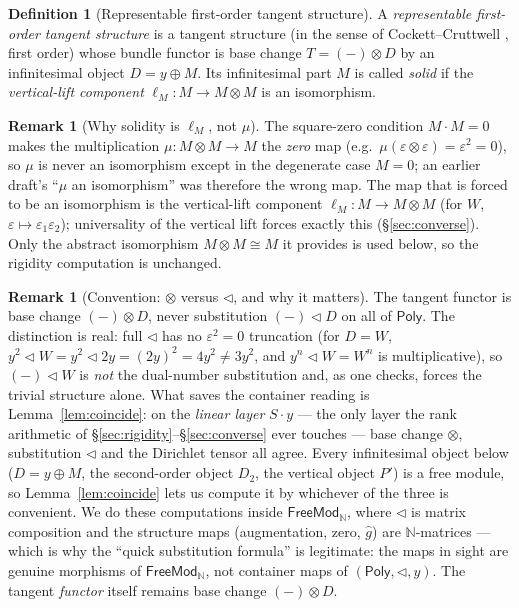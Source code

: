 \documentclass[11pt]{article}
\theoremstyle{definition}
\newtheorem{definition}[theorem]{Definition}
\newtheorem{remark}[theorem]{Remark}
\newcommand{\FreeMod}{\mathsf{FreeMod}}
\newcommand{\Poly}{\mathsf{Poly}}
\newcommand{\N}{\mathbb{N}}
\begin{document}
\begin{definition}[Representable first-order tangent structure]\label{def:tangent}
A \emph{representable first-order tangent structure} is a tangent structure (in the sense of
Cockett--Cruttwell \cite{CockettCruttwell2014}, first order) whose bundle functor is base change
$T=(-)\otimes D$ by an infinitesimal object $D=y\oplus M$. Its infinitesimal part $M$ is called
\emph{solid} if the \emph{vertical-lift component} $\ell_M\colon M\to M\otimes M$ is an isomorphism.
\end{definition}

\begin{remark}[Why solidity is $\ell_M$, not $\mu$]\label{rem:solid}
The square-zero condition $M\cdot M=0$ makes the multiplication $\mu\colon M\otimes M\to M$ the
\emph{zero} map (e.g.\ $\mu(\varepsilon\otimes\varepsilon)=\varepsilon^2=0$), so $\mu$ is never an
isomorphism except in the degenerate case $M=0$; an earlier draft's ``$\mu$ an isomorphism'' was
therefore the wrong map. The map that is forced to be an isomorphism is the vertical-lift component
$\ell_M\colon M\to M\otimes M$ (for $W$, $\varepsilon\mapsto\varepsilon_1\varepsilon_2$); universality
of the vertical lift forces exactly this (\S\ref{sec:converse}). Only the abstract isomorphism
$M\otimes M\cong M$ it provides is used below, so the rigidity computation is unchanged.
\end{remark}

\begin{remark}[Convention: $\otimes$ versus $\lhd$, and why it matters]\label{rem:convention}
The tangent functor is base change $(-)\otimes D$, never substitution $(-)\lhd D$ on all of $\Poly$.
The distinction is real: full $\lhd$ has no $\varepsilon^2=0$ truncation (for $D=W$,
$y^2\lhd W=y^2\lhd 2y=(2y)^2=4y^2\neq 3y^2$, and $y^n\lhd W=W^n$ is multiplicative), so $(-)\lhd W$ is
\emph{not} the dual-number substitution and, as one checks, forces the trivial structure alone. What
saves the container reading is Lemma~\ref{lem:coincide}: on the \emph{linear layer} $S\cdot y$ --- the
only layer the rank arithmetic of \S\ref{sec:rigidity}--\S\ref{sec:converse} ever touches --- base
change $\otimes$, substitution $\lhd$ and the Dirichlet tensor all agree. Every infinitesimal object
below ($D=y\oplus M$, the second-order object $D_2$, the vertical object $P'$) is a free module, so
Lemma~\ref{lem:coincide} lets us compute it by whichever of the three is convenient. We do these
computations inside $\FreeMod_\N$, where $\lhd$ is matrix composition and the structure maps
(augmentation, zero, $\hat g$) are $\N$-matrices --- which is why the ``quick substitution formula''
is legitimate: the maps in sight are genuine morphisms of $\FreeMod_\N$, not container maps of
$(\Poly,\lhd,y)$. The tangent \emph{functor} itself remains base change $(-)\otimes D$.
\end{remark}
\end{document}
